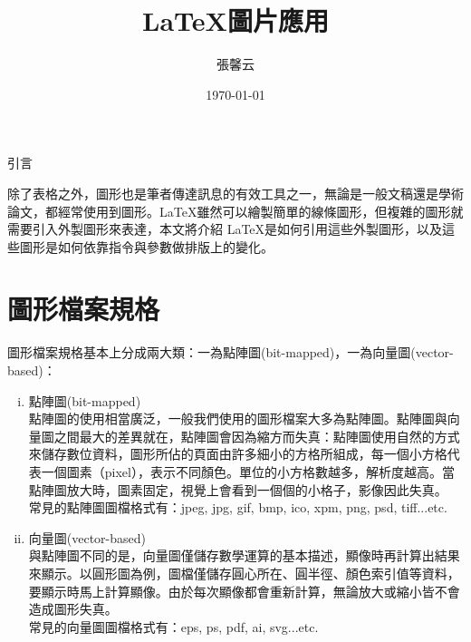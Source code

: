   


\title{ \LaTeX{\UD 圖片應用}}
\author{{\NC 張馨云}\;\; {}}
\date{{\BR \today}} 	


\maketitle
\fontsize{12}{22 pt}\selectfont

\centerline{{\BCF 引言}}
\setlength{\parindent}{2em} 
	除了表格之外，圖形也是筆者傳達訊息的有效工具之一，無論是一般文稿還是學術論文，都經常使用到圖形。\LaTeX 雖然可以繪製簡單的線條圖形，但複雜的圖形就需要引入外製圖形來表達，本文將介紹 \LaTeX 是如何引用這些外製圖形，以及這些圖形是如何依靠指令與參數做排版上的變化。

\section{{\CB 圖形檔案規格}}
	圖形檔案規格基本上分成兩大類：一為點陣圖(bit-mapped)，一為向量圖(vector-based)：
	\begin{enumerate}[i. ]
	\item 點陣圖(bit-mapped) \\
	點陣圖的使用相當廣泛，一般我們使用的圖形檔案大多為點陣圖。點陣圖與向量圖之間最大的差異就在，點陣圖會因為縮方而失真：點陣圖使用自然的方式來儲存數位資料，圖形所佔的頁面由許多細小的方格所組成，每一個小方格代表一個圖素（pixel），表示不同顏色。單位的小方格數越多，解析度越高。當點陣圖放大時，圖素固定，視覺上會看到一個個的小格子，影像因此失真。\\
	常見的點陣圖圖檔格式有：jpeg, jpg, gif, bmp, ico, xpm, png, psd, tiﬀ...etc.
	\item 向量圖(vector-based) \\
	與點陣圖不同的是，向量圖僅儲存數學運算的基本描述，顯像時再計算出結果來顯示。以圓形圖為例，圖檔僅儲存圓心所在、圓半徑、顏色索引值等資料，要顯示時馬上計算顯像。由於每次顯像都會重新計算，無論放大或縮小皆不會造成圖形失真。 \\
	常見的向量圖圖檔格式有：eps, ps, pdf, ai, svg...etc.
	\end{enumerate}



